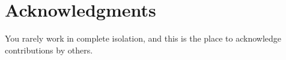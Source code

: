 \chapter*{Acknowledgments}

You rarely work in complete isolation, and this is the place to acknowledge contributions by others.
